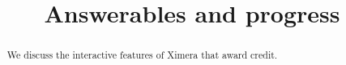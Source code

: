 \documentclass{xourse}
\title{Answerables and progress}
\begin{document}
\begin{abstract}
We discuss the interactive features of Ximera that award credit. 
\end{abstract}
\maketite
\end{document}
